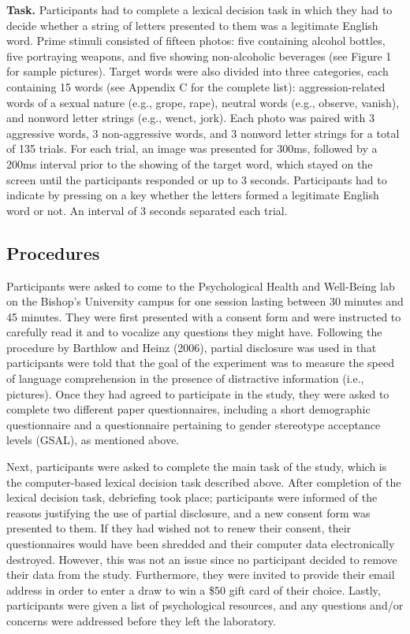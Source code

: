 \documentclass[authordate, serif, review]{jote-article}
\begin{document}
\begin{multicols}{2}
\textbf{Task.} Participants had to complete a lexical decision task in which they had to decide whether a string of letters presented to them was a legitimate English word. Prime stimuli consisted of fifteen photos: five containing alcohol bottles, five portraying weapons, and five showing non-alcoholic beverages (see Figure 1 for sample pictures). Target words were also divided into three categories, each containing 15 words (see Appendix C for the complete list): aggression-related words of a sexual nature (e.g., grope, rape), neutral words (e.g., observe, vanish), and nonword letter strings (e.g., wenct, jork). Each photo was paired with 3 aggressive words, 3 non-aggressive words, and 3 nonword letter strings for a total of 135 trials. For each trial, an image was presented for 300ms, followed by a 200ms interval prior to the showing of the target word, which stayed on the screen until the participants responded or up to 3 seconds. Participants had to indicate by pressing on a key whether the letters formed a legitimate English word or not. An interval of 3 seconds separated each trial.

{}
\subsection*{Procedures}

Participants were asked to come to the Psychological Health and Well-Being lab on the Bishop's University campus for one session lasting between 30 minutes and 45 minutes. They were first presented with a consent form and were instructed to carefully read it and to vocalize any questions they might have. Following the procedure by Barthlow and Heinz (2006), partial disclosure was used in that participants were told that the goal of the experiment was to measure the speed of language comprehension in the presence of distractive information (i.e., pictures). Once they had agreed to participate in the study, they were asked to complete two different paper questionnaires, including a short demographic questionnaire and a questionnaire pertaining to gender stereotype acceptance levels (GSAL), as mentioned above. 

Next, participants were asked to complete the main task of the study, which is the computer-based lexical decision task described above. After completion of the lexical decision task, debriefing took place; participants were informed of the reasons justifying the use of partial disclosure, and a new consent form was presented to them. If they had wished not to renew their consent, their questionnaires would have been shredded and their computer data electronically destroyed. However, this was not an issue since no participant decided to remove their data from the study. Furthermore, they were invited to provide their email address in order to enter a draw to win a \$50 gift card of their choice. Lastly, participants were given a list of psychological resources, and any questions and/or concerns were addressed before they left the laboratory.


\end{multicols}
\end{document}
